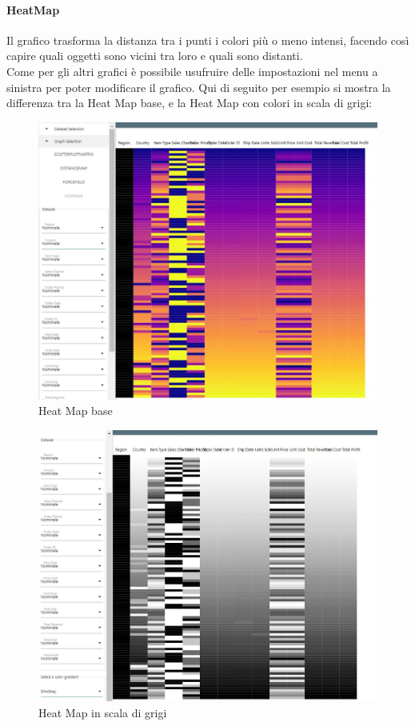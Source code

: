 \documentclass[../manuale_utente.tex]{subfiles}
\begin{document}
\paragraph{HeatMap}
    \label{par:vis_heatmap}

Il grafico  trasforma la distanza tra i punti i colori più o meno intensi, facendo così capire quali oggetti sono vicini tra loro e quali sono distanti. \\
Come per gli altri grafici è possibile usufruire delle impostazioni nel menu a sinistra per poter modificare il grafico. Qui di seguito per esempio si mostra la differenza 
tra la Heat Map base, e la Heat Map con colori in scala di grigi:

\begin{figure}[H]
	\centering
	\includegraphics[width=18cm]{img/hm/heat_map_base.jpg}
	\caption{Heat Map base}
\end{figure}

\begin{figure}[H]
	\centering
	\includegraphics[width=18cm]{img/hm/heat_map_base_gray.jpg}
	\caption{Heat Map in scala di grigi}
\end{figure}
\end{document}
